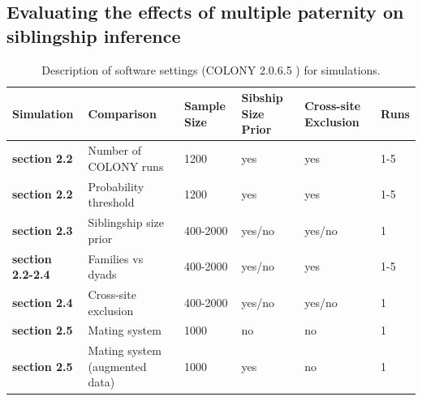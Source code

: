 \documentclass[12pt]{article}
\begin{document}
\subsection{Evaluating the effects of multiple paternity on siblingship inference}

\begin{table}[H]
\centering
\caption{Description of software settings (COLONY 2.0.6.5 \parencite{jonesCOLONYProgramParentage2010}) for simulations.}
\label{tab:softwarespecs}
\footnotesize
\begin{tabular}{ p{2cm}  p{3.5cm} p{2cm} p{2.5cm} p{2cm} p{1.5cm}}
\hline
\textbf{Simulation}& \textbf{Comparison}&\textbf{Sample Size}& \textbf{Sibship Size Prior}& \textbf{Cross-site Exclusion}& \textbf{Runs}\\
\hline
\textbf{section 2.2} & Number of COLONY runs& 1200 & yes& yes& 1-5\\
\hline
\textbf{section 2.2} & Probability threshold& 1200 & yes & yes & 1-5\\
\hline
\textbf{section 2.3} & Siblingship size prior & 400-2000 & yes/no & yes/no& 1\\
\hline
\textbf{section 2.2-2.4} & Families vs dyads & 400-2000 & yes/no & yes& 1-5\\
\hline
\textbf{section 2.4} & Cross-site exclusion & 400-2000 & yes/no & yes/no& 1\\
\hline
\textbf{section 2.5} & Mating system& 1000 & no & no& 1\\
   \hline  
\textbf{section 2.5} & Mating system (augmented data)& 1000 & yes & no& 1 \\
   \hline  
\end{tabular}
\end{table}
\end{document}

